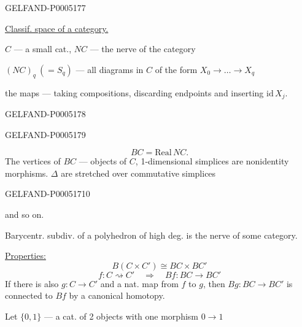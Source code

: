 \begin{GelfandAdjacentEvidence}{GELFAND-P000517}{7}


\uline{Classif. space of a category.}

$C$ — a small cat., $NC$ — the nerve of the category

$(NC)_q\ (=S_q)$ — all diagrams in $C$ of the form $X_0\to\ldots\to X_q$

the maps — taking compositions, discarding endpoints and inserting $\mathrm{id}\,X_j$.
\end{GelfandAdjacentEvidence}
\begin{GelfandAdjacentEvidence}{GELFAND-P000517}{8}

\end{GelfandAdjacentEvidence}
\begin{GelfandAdjacentEvidence}{GELFAND-P000517}{9}

\[
BC=\mathrm{Real}\,NC.
\]
The vertices of $BC$ — objects of $C$, 1-dimensional simplices are nonidentity morphisms.
$\Delta$ are stretched over commutative simplices
\end{GelfandAdjacentEvidence}
\begin{GelfandAdjacentEvidence}{GELFAND-P000517}{10}

and so on.

Barycentr. subdiv. of a polyhedron of high deg. is the nerve of some category.
\end{GelfandAdjacentEvidence}


\uline{Properties:}
\[
B(C\times C')\cong BC\times BC'
\]
\[
f:C\rightsquigarrow C'\quad\Rightarrow\quad Bf:BC\to BC'
\]
If there is also $g:C\to C'$ and a nat. map from $f$ to $g$, then
$Bg:BC\to BC'$ is connected to $Bf$ by a canonical homotopy.

Let $\{0,1\}$ — a cat. of 2 objects with one morphism $0\to1$

